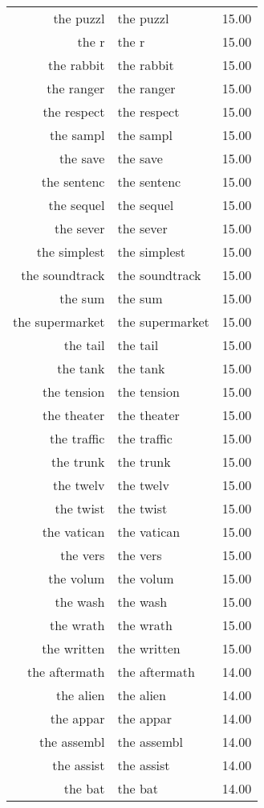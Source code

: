\begin{table}[ht]
\begin{tabular}{rlr}
  the puzzl & the puzzl & 15.00 \\ 
  the r & the r & 15.00 \\ 
  the rabbit & the rabbit & 15.00 \\ 
  the ranger & the ranger & 15.00 \\ 
  the respect & the respect & 15.00 \\ 
  the sampl & the sampl & 15.00 \\ 
  the save & the save & 15.00 \\ 
  the sentenc & the sentenc & 15.00 \\ 
  the sequel & the sequel & 15.00 \\ 
  the sever & the sever & 15.00 \\ 
  the simplest & the simplest & 15.00 \\ 
  the soundtrack & the soundtrack & 15.00 \\ 
  the sum & the sum & 15.00 \\ 
  the supermarket & the supermarket & 15.00 \\ 
  the tail & the tail & 15.00 \\ 
  the tank & the tank & 15.00 \\ 
  the tension & the tension & 15.00 \\ 
  the theater & the theater & 15.00 \\ 
  the traffic & the traffic & 15.00 \\ 
  the trunk & the trunk & 15.00 \\ 
  the twelv & the twelv & 15.00 \\ 
  the twist & the twist & 15.00 \\ 
  the vatican & the vatican & 15.00 \\ 
  the vers & the vers & 15.00 \\ 
  the volum & the volum & 15.00 \\ 
  the wash & the wash & 15.00 \\ 
  the wrath & the wrath & 15.00 \\ 
  the written & the written & 15.00 \\ 
  the aftermath & the aftermath & 14.00 \\ 
  the alien & the alien & 14.00 \\ 
  the appar & the appar & 14.00 \\ 
  the assembl & the assembl & 14.00 \\ 
  the assist & the assist & 14.00 \\ 
  the bat & the bat & 14.00 \\ 

\end{tabular}
\end{table}
